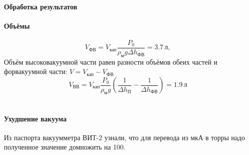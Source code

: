 \documentclass{letnab}
\begin{document}
\paragraph{Обработка результатов}
\paragraph{Объёмы}
$$ V_\text{ФВ} = V_\text{кап} \frac{P_0}{\rho_\text{м}g \Delta h_\text{ФВ}} = 3.7\,\text{л},$$ 
Объём высоковакуумной части равен разности объёмов обеих частей и форвакуумной части: $V=V_\text{кап} - V_\text{ФВ}$\\
$$V_\text{ВВ} = V_\text{кап} \frac{P_0}{\rho_\text{м}g} \left( \frac{1}{\Delta h_\text{П}} - \frac{1}{\Delta h_\text{ФВ}} \right) = 1.9\,\text{л}$$\\	
\paragraph{Ухудшение вакуума}
Из паспорта вакуумметра ВИТ-2 узнали, что для перевода из мкА в торры надо полученное значение домножить на 100.
\end{document}
